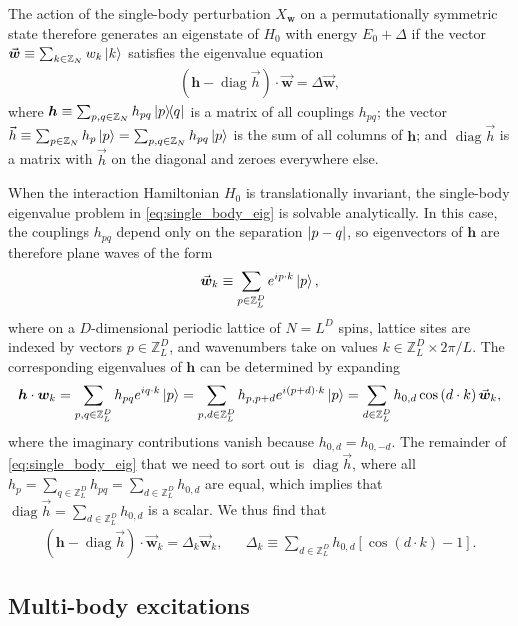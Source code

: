 \documentclass[nofootinbib,notitlepage,11pt]{revtex4-2}
\newcommand{\p}[1]{\left(#1\right)} %
\renewcommand{\sp}[1]{\left[#1\right]} %
\renewcommand{\c}{\cdot} %
\newcommand{\m}{\bm} %
\renewcommand{\v}{\vec} %
\newcommand{\1}{\mathds{1}}
\newcommand{\ZZ}{\mathbb{Z}}
\DeclareMathOperator{\diag}{diag}
\begin{document}
The action of the single-body perturbation $X_{\m w}$ on a
permutationally symmetric state therefore generates an eigenstate of
$H_0$ with energy $E_0+\Delta$ if the vector
$\v{\m w}\equiv\sum_{k\in\ZZ_N} w_k \ket{k}$ satisfies the eigenvalue
equation
\begin{align}
  \p{\m h - \diag\v h} \c \v{\m w} = \Delta \v{\m w},
  \label{eq:single_body_eig}
\end{align}
where $\m h\equiv\sum_{p,q\in\ZZ_N} h_{pq} \op{p}{q}$ is a matrix of
all couplings $h_{pq}$; the vector
$\v h \equiv \sum_{p\in\ZZ_N} h_p \ket{p} = \sum_{p,q\in\ZZ_N} h_{pq}
\ket{p}$ is the sum of all columns of $\m h$; and $\diag\v h$ is a
matrix with $\v h$ on the diagonal and zeroes everywhere else.

When the interaction Hamiltonian $H_0$ is translationally invariant,
the single-body eigenvalue problem in \eqref{eq:single_body_eig} is
solvable analytically.  In this case, the couplings $h_{pq}$ depend
only on the separation $\abs{p-q}$, so eigenvectors of $\m h$ are
therefore plane waves of the form
\begin{align}
  \v{\m w}_k \equiv \sum_{p\in\ZZ_L^D} e^{ip\c k} \ket{p},
\end{align}
where on a $D$-dimensional periodic lattice of $N=L^D$ spins, lattice
sites are indexed by vectors $p\in\ZZ_L^D$, and wavenumbers take on
values $k\in\ZZ_L^D\times2\pi/L$.  The corresponding eigenvalues of
$\m h$ can be determined by expanding
\begin{align}
  \m h\c{\m w}_k
  = \sum_{p,q\in\ZZ_L^D} h_{pq} e^{iq\c k} \ket{p}
  = \sum_{p,d\in\ZZ_L^D} h_{p,p+d} e^{i\p{p+d}\c k} \ket{p}
  = \sum_{d\in\ZZ_L^D} h_{0,d} \cos\p{d\c k} \v{\m w}_k,
\end{align}
where the imaginary contributions vanish because $h_{0,d}=h_{0,-d}$.
The remainder of \eqref{eq:single_body_eig} that we need to sort out
is $\diag\v h$, where all
$h_p=\sum_{q\in\ZZ_L^D}h_{pq}=\sum_{d\in\ZZ_L^D}h_{0,d}$ are equal,
which implies that $\diag\v h=\sum_{d\in\ZZ_L^D}h_{0,d}$ is a scalar.
We thus find that
\begin{align}
  \p{\m h - \diag\v h}\c\v{\m w}_k = \Delta_k \v{\m w}_k,
  &&
  \Delta_k \equiv \sum_{d\in\ZZ_L^D} h_{0,d} \sp{\cos\p{d\c k}-1}.
\end{align}

\subsection{Multi-body excitations}
\end{document}
